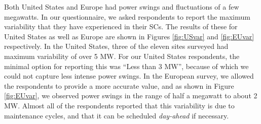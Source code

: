 Both United States and Europe had power swings and fluctuations of a few megawatts. In our questionnaire, we asked respondents to report the maximum variability that they have experienced in their SCs. The results of these for United States as well as Europe are shown in Figures \ref{fig:USvar} and \ref{fig:EUvar} respectively. In the United States, three of the eleven sites surveyed had maximum variability of over 5 MW. For our United States respondents, the minimal option for reporting this was ``Less than 3 MW'', because of which we could not capture less intense power swings. In the European survey, we allowed the respondents to provide a more accurate value, and as shown in Figure \ref{fig:EUvar}, we observed power swings in the range of half a megawatt to about 2 MW. Almost all of the respondents reported that this variability is due to maintenance cycles, and that it can be scheduled \emph{day-ahead} if necessary.
